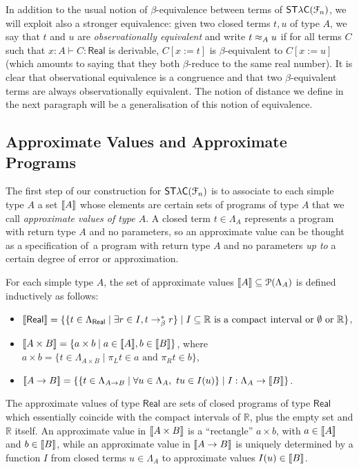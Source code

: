 In addition to the usual notion of $\beta$-equivalence between terms of $\mathsf{ST\lambda C}(\mathcal F_{n})$, we will exploit also a stronger equivalence: given two closed terms $t,u$ of type $A$,  we say that $t$ and $u$ are \emph{observationally equivalent} and write $t \approx_A u$ if for all terms $C$ such that $x:A \vdash C : \mathsf{Real}$ is derivable, $C[x:=t]$ is $\beta$-equivalent to $C[x:=u]$ (which amounts to saying that they both $\beta$-reduce to the same real number).  It is clear that observational equivalence is a congruence and that two $\beta$-equivalent terms are always observationally equivalent. The notion of distance we define in the next paragraph will be a generalisation of this notion of equivalence.



\subsection{Approximate Values and Approximate Programs}

The first step of our construction for $\mathsf{ST\lambda C}(\mathcal F_{n})$ is to associate to each simple type $A$ a set $\llbracket A \rrbracket$ whose elements are certain sets of programs of type $A$ that we call \emph{approximate values of type $A$}. 
A closed term $t\in \Lambda_{A}$ represents a program with return type $A$ and no parameters, so an approximate value can be thought as a specification of a program with return type $A$ and no parameters \emph{up to} a certain degree of error or approximation.

For each simple type $A$, the set of approximate values $\llbracket A \rrbracket\subseteq \mathcal P(\Lambda_A)$ is defined inductively as follows:
\begin{itemize}
\item $\llbracket \mathsf{Real} \rrbracket = \{ \{ t \in \Lambda_\mathsf{Real} \mid \exists r \in I, t \to_\beta^* r \} \mid I \subseteq \mathbb{R} \text{ is a compact interval or $\emptyset$ or } \mathbb{R} \}$,
\item $\llbracket A \times B \rrbracket = \{ a \times b \mid a  \in \llbracket A \rrbracket, b \in \llbracket B \rrbracket \}$, where $a \times b = \{ t \in \Lambda_{A \times B} \mid \pi_L t \in a \text{ and } \pi_R t \in b \}$,
\item $\llbracket A \to B \rrbracket = \{ \{ t \in \Lambda_{A \to B} \mid \forall u \in \Lambda_{A},~ tu \in I(u) \} \mid I : \Lambda_A \to \llbracket B \rrbracket \}$.
\end{itemize}

The approximate values of type $\mathsf{Real}$ are sets of closed programs of type $\mathsf{Real}$ which essentially coincide with the compact intervals of $\mathbb R$, plus the empty set and $\mathbb{R}$ itself. An approximate value in $\llbracket A\times B \rrbracket$ is a ``rectangle'' $a \times b$, with $a\in \llbracket A \rrbracket$ and $b \in \llbracket B \rrbracket$, while an approximate value in $\llbracket A\to B \rrbracket$ is uniquely determined by a function 
$I$ from closed terms $u\in \Lambda_{ A}$ to approximate values $I(u)\in \llbracket B \rrbracket$.

